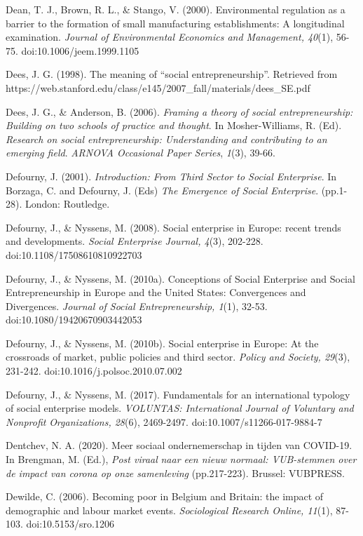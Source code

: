 \documentclass{article}
\begin{document}
Dean, T. J., Brown, R. L., \& Stango, V. (2000). Environmental regulation as a barrier to the formation of small manufacturing establishments: A longitudinal examination. \emph{Journal of Environmental Economics and Management, 40}(1), 56-75. doi:10.1006/jeem.1999.1105

Dees, J. G. (1998). The meaning of “social entrepreneurship”. Retrieved from https://web.stanford.edu/class/e145/2007\_fall/materials/dees\_SE.pdf

Dees, J. G., \& Anderson, B. (2006). \emph{Framing a theory of social entrepreneurship: Building on two schools of practice and thought}. In Mosher-Williams, R. (Ed). \emph{Research on social entrepreneurship: Understanding and contributing to an emerging field}. \emph{ARNOVA Occasional Paper Series}, \emph{1}(3), 39-66. 

Defourny, J. (2001). \emph{Introduction: From Third Sector to Social Enterprise}. In Borzaga, C. and Defourny, J. (Eds) \emph{The Emergence of Social Enterprise}. (pp.1-28). London: Routledge.

Defourny, J., \& Nyssens, M. (2008). Social enterprise in Europe: recent trends and developments. \emph{Social Enterprise Journal, 4}(3), 202-228. doi:10.1108/17508610810922703

Defourny, J., \& Nyssens, M. (2010a). Conceptions of Social Enterprise and Social Entrepreneurship in Europe and the United States: Convergences and Divergences. \emph{Journal of Social Entrepreneurship, 1}(1), 32-53. doi:10.1080/19420670903442053

Defourny, J., \& Nyssens, M. (2010b). Social enterprise in Europe: At the crossroads of market, public policies and third sector. \emph{Policy and Society, 29}(3), 231-242. doi:10.1016/j.polsoc.2010.07.002

Defourny, J., \& Nyssens, M. (2017). Fundamentals for an international typology of social enterprise models. \emph{VOLUNTAS: International Journal of Voluntary and }\emph{Nonprofit}\emph{ Organizations, 28}(6), 2469-2497. doi:10.1007/s11266-017-9884-7

Dentchev, N. A. (2020). Meer sociaal ondernemerschap in tijden van COVID-19. In Brengman, M. (Ed.), \emph{Post viraal}\emph{ naar een nieuw normaal: VUB-stemmen over de impact van corona op onze samenleving} (pp.217-223). Brussel: VUBPRESS.

Dewilde, C. (2006). Becoming poor in Belgium and Britain: the impact of demographic and labour market events. \emph{Sociological Research Online, 11}(1), 87-103. doi:10.5153/sro.1206
\end{document}
